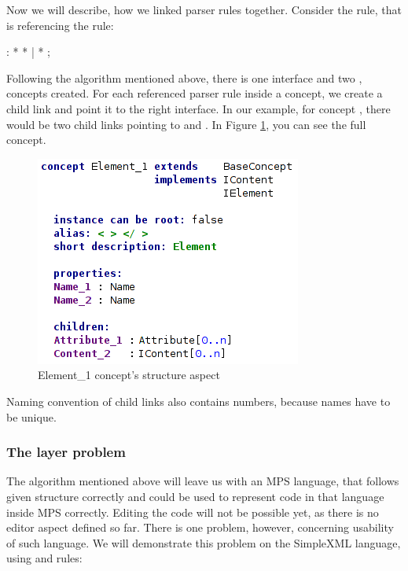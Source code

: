 Now we will describe, how we linked parser rules together.
Consider the  rule, that is referencing the  rule:

\begin{antlr}
	    :   \literal{<}  * \literal{>} * \literal{</}  \literal{>}
           |   \literal{<}  * \literal{/>}
           ;
\end{antlr}

Following the algorithm mentioned above, there is one  interface and two ,  concepts created.
For each referenced parser rule inside a concept, we create a child link and point it to the right interface.
In our example, for concept , there would be two child links pointing to  and .
In Figure \ref{fig:element_concept_full}, you can see the full  concept.

\begin{figure}[h]
	\centering
	\includegraphics[scale=0.7]{./img/element_concept_full.png}
	\caption{Element{\_}1 concept's structure aspect}
	\label{fig:element_concept_full}
\end{figure}

Naming convention of child links also contains numbers, because names have to be unique.

\subsubsection{The layer problem}
\label{chap:layer_problem}

The algorithm mentioned above will leave us with an MPS language, that follows given structure correctly and could be used to represent code in that language inside MPS correctly. Editing the code will not be possible yet, as there is no editor aspect defined so far.
There is one problem, however, concerning usability of such language.
We will demonstrate this problem on the SimpleXML language, using  and  rules:

